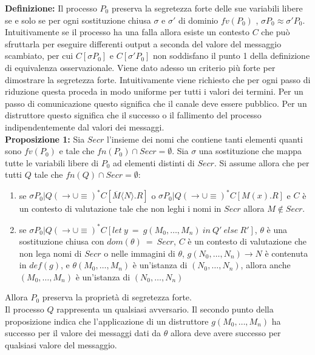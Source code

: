 \documentclass[12pt]{report}
\begin{document}
\textbf{Definizione:} Il processo $P_0$ preserva la segretezza forte delle sue variabili libere se e solo se per ogni sostituzione chiusa $\sigma$ e $\sigma'$ di dominio $fv(P_0)$ , $\sigma P_0 \approx \sigma' P_0$.\\

Intuitivamente se il processo ha una falla allora esiste un contesto $C$ che può sfruttarla per eseguire differenti output a seconda del valore del messaggio scambiato, per cui $C[\sigma P_0]$ e $C[\sigma' P_0]$ non soddisfano il punto 1 della definizione di equivalenza osservazionale. Viene dato adesso un criterio più forte per dimostrare la segretezza forte. Intuitivamente viene richiesto che per ogni passo di riduzione questa proceda in modo uniforme per tutti i valori dei termini. Per un passo di comunicazione questo significa che il canale deve essere pubblico. Per un distruttore questo significa che il successo o il fallimento del processo indipendentemente dal valori dei messaggi.\\

\textbf{Proposizione 1:} Sia $Secr$ l'insieme dei nomi che contiene tanti elementi quanti sono $fv(P_0)$  e tale che $fn(P_0) \cap Secr = \emptyset$. Sia $\sigma$ una sostituzione che mappa tutte le variabili libere di $P_0$ ad elementi distinti di $Secr$. Si assume allora che per tutti $Q$ tale che $fn(Q) \cap Secr = \emptyset$:
\begin{enumerate}
    \item se $\sigma P_0 | Q (\rightarrow \cup \equiv)^* C[\overline{M} \langle N \rangle . R]$ o $\sigma P_0 | Q (\rightarrow \cup \equiv)^* C[M(x).R]$ e $C$ è un contesto di valutazione tale che non leghi i nomi in $Secr$ allora $M \notin Secr$.
    
    \item se $\sigma P_0 | Q (\rightarrow \cup \equiv)^* C[let\ y\ =\ g(M_0,\dots,M_n)\ in\ Q'\ else\ R']$, $\theta$ è una sostituzione chiusa con $dom(\theta)\ =\ Secr$, $C$ è un contesto di valutazione che non lega nomi di $Secr$ o nelle immagini di $\theta$, $g(N_0,\dots,N_n) \rightarrow N$ è contenuta in $def(g)$, e $\theta (M_0,\dots,M_n)$ è un'istanza di $(N_0,\dots,N_n)$, allora anche $(M_0,\dots,M_n)$ è un'istanza di $(N_0,\dots,N_n)$   
\end{enumerate}
Allora $P_0$ preserva la proprietà di segretezza forte.\\

Il processo $Q$ rappresenta un qualsiasi avversario. Il secondo punto della proposizione indica che l'applicazione di un distruttore $g(M_0,\dots,M_n)$ ha successo per il valore dei messaggi dati da $\theta$ allora deve avere successo per qualsiasi valore del messaggio.\\ 
\end{document}
